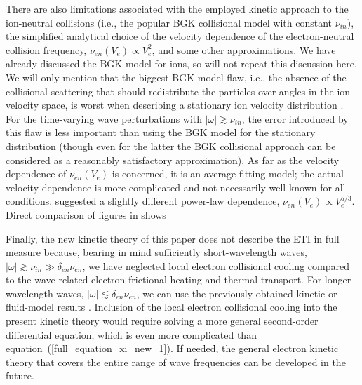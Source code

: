 \documentclass[draft]{agujournal2019}
\begin{document}
{There are also limitations associated with the employed kinetic
approach to the ion-neutral collisions (i.e., the popular BGK collisional model
with constant $\nu_{in}$), the simplified analytical choice of the velocity
dependence of the electron-neutral collision frequency, 
$\nu_{en}(V_{e})\propto V_{e}^{2}$, and some other approximations. We have already
discussed the BGK model for ions, so will not repeat this discussion here. We will only
mention that the biggest BGK model flaw, i.e., the absence of the collisional
scattering that should redistribute the particles over angles in the
ion-velocity space, is worst when describing a stationary ion velocity
distribution \cite{Koontaweepunya:Non-Maxwellian24}. For the time-varying wave
perturbations with $|\omega|\gtrsim\nu_{in}$, the error introduced by this
flaw is less important than using the BGK model for the stationary
distribution (though even for the latter the BGK collisional approach can be
considered as a reasonably satisfactory approximation). As far as the velocity
dependence of $\nu_{en}(V_{e})$ is concerned, it is an average fitting model; the
actual velocity dependence is more complicated and not necessarily well known
for all conditions.  suggested a slightly different
power-law dependence, $\nu_{en}(V_{e})\propto V_{e}^{5/3}$. Direct comparison
of figures in  shows

Finally, the new kinetic theory of this paper does not describe the ETI 
in full measure because, bearing in mind sufficiently short-wavelength waves, 
$|\omega|\gtrsim \nu_{in}\gg \delta_{en}\nu_{en}$,  we have neglected local electron collisional 
cooling compared to the wave-related electron frictional heating and thermal transport. For longer-wavelength waves, 
$|\omega|\lesssim \delta_{en}\nu_{en}$, we can use the previously obtained kinetic or 
fluid-model results \cite{Dimant:Kinetic95b,Dimant:Kinetic95c,Dimant:Physical97}. 
Inclusion of the local electron collisional cooling into the present 
kinetic theory would require solving a more general second-order differential 
equation, which is even more complicated than equation~(\ref{full_equation_xi_new_1}). 
If needed, the general electron kinetic theory that covers the entire range of wave frequencies can be developed in the future.

}
\end{document}
